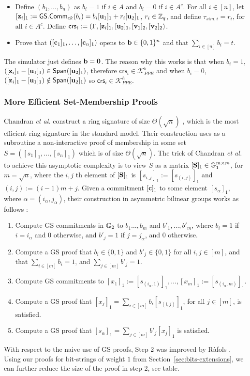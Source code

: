 \begin{itemize}
\item Define $(b_1,\ldots,b_n)$ as $b_i=1$
if $i \in A$ and $b_i=0$ if $i \in A^c$. For all $i \in [n]$, let $[\mathbf{z}_i]_1:=\mathsf{GS.Comm}_{ck}(b_i)=b_i [\mathbf{u}_1]_1+ r_i [\mathbf{u}_2]_1$, $r_i \in \mathbb{Z}_q$, and define $\tau_{sim,i}=r_i$, for all $i \in A^c$. Define $\mathsf{crs}_i:=(\Gamma,[\mathbf{z}_i]_1,[\mathbf{u}_2]_1,[\mathbf{v}_1]_2,[\mathbf{v}_2]_2)$. 
\item Prove that $([\mathbf{c}_1]_1,\ldots,[\mathbf{c}_n]_1)$ opens to $\mathbf{b} \in \{0,1\}^{n}$ and that $\sum_{i\in[n]} b_i=t$.
\end{itemize}
The simulator just defines $\mathbf{b}=\mathbf{0}$. The reason why this works is that when $b_i=1$, $([\mathbf{z}_i]_1-[\mathbf{u}_1]_1) \in \mathsf{Span}( [\mathbf{u}_2]_1)$, therefore $\mathsf{crs}_i \in \mathcal{K}^{b}_{PPE}$ and when
$b_i=0$,  $([\mathbf{z}_i]_1-[\mathbf{u}_1]_1) \notin \mathsf{Span}( [\mathbf{u}_2]_1)$ so $\mathsf{crs}_i \in \mathcal{K}^{h}_{PPE}$.

\subsubsection{More Efficient Set-Membership Proofs} Chandran \textit{et al.} construct a ring signature of size $\Theta(\sqrt{n})$ \cite{ICALP:ChaGroSah07}, which is the most efficient ring signature in the standard model. Their construction uses as a subroutine a non-interactive proof of membership in some set $S=([s_1]_1,\ldots,[s_n]_1)$ which is of size $\Theta(\sqrt{n})$.  The trick of Chandran \textit{et al.} to achieve this asymptotic complexity is to view $S$ as a matrix $[\mathbf{{S}}]_1\in\mathbb{G}_1^{m\times m}$, for $m=\sqrt{n}$, where the $i,j$ th element of $[\mathbf{{S}}]_1$ is $[s_{i,j}]_1 := [s_{(i,j)}]_1$ and $(i,j):=(i-1)m+j$. Given a commitment $[\mathbf{c}]_1$ to some element $[s_{\alpha}]_1$, where $\alpha = (i_\alpha,j_\alpha)$, their construction in asymmetric bilinear groups works as follows :
\begin{enumerate}
\item Compute GS commitments in $\mathbb{G}_2$ to $b_1\ldots,b_m$ and $b'_1,\ldots,b'_m$,
      where $b_i = 1$ if $i=i_\alpha$ and $0$ otherwise, and $b'_{j}=1$ if $j=j_\alpha$, and $0$ otherwise.
\item Compute a GS proof that $b_i \in \{0,1\}$ and $b'_j \in \{0,1\}$ for all $i,j\in[m]$, and that $\sum_{i\in[m]}b_i=1$, and $\sum_{j\in[m]}b'_j=1$.
\item Compute GS commitments to $[x_1]_1:=[s_{(i_\alpha,1)}]_1,\ldots,[x_m]_1:=[s_{(i_\alpha,m)}]_1$.
\item Compute a GS proof that $[x_j]_1 = \sum_{i\in[m]}b_i[s_{(i,j)}]_1$, for all $j\in[m]$, is satisfied. 
\item Compute a GS proof that $[s_{\alpha}]_1 = \sum_{j\in[m]}b'_j[x_j]_1$ is satisfied.
\end{enumerate}
With respect to the naive use of GS proofs, Step $2$ was improved by R\`afols \cite{TCC:Rafols15}.  Using our proofs for bit-strings of weight $1$ from Section~\ref{sec:bits-extensions}, we can further reduce the size of the proof in step 2, 
see table.

